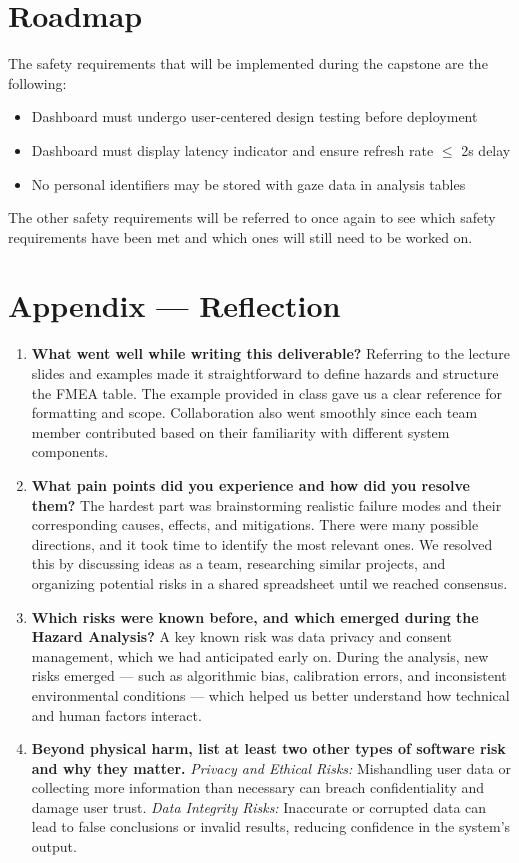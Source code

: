 \documentclass{article}
\begin{document}
\section{Roadmap}
The safety requirements that will be implemented during the capstone are the following: 
\begin{itemize}
    \item Dashboard must undergo user-centered design testing before deployment
    \item Dashboard must display latency indicator and ensure refresh rate $\leq$ 2s delay
    \item No personal identifiers may be stored with gaze data in analysis tables
\end{itemize}
The other safety requirements will be referred to once again to see which safety requirements have been met and which ones will still need to be worked on. 

\newpage
\section*{Appendix --- Reflection}
\begin{enumerate}
    \item \textbf{What went well while writing this deliverable?}  
    Referring to the lecture slides and examples made it straightforward to define hazards and structure the FMEA table. The example provided in class gave us a clear reference for formatting and scope. Collaboration also went smoothly since each team member contributed based on their familiarity with different system components.

    \item \textbf{What pain points did you experience and how did you resolve them?}  
    The hardest part was brainstorming realistic failure modes and their corresponding causes, effects, and mitigations. There were many possible directions, and it took time to identify the most relevant ones. We resolved this by discussing ideas as a team, researching similar projects, and organizing potential risks in a shared spreadsheet until we reached consensus.

    \item \textbf{Which risks were known before, and which emerged during the Hazard Analysis?}  
    A key known risk was data privacy and consent management, which we had anticipated early on. During the analysis, new risks emerged — such as algorithmic bias, calibration errors, and inconsistent environmental conditions — which helped us better understand how technical and human factors interact.

    \item \textbf{Beyond physical harm, list at least two other types of software risk and why they matter.}  
    \textit{Privacy and Ethical Risks:} Mishandling user data or collecting more information than necessary can breach confidentiality and damage user trust.  
    \textit{Data Integrity Risks:} Inaccurate or corrupted data can lead to false conclusions or invalid results, reducing confidence in the system’s output.
    
\end{enumerate}
\end{document}
